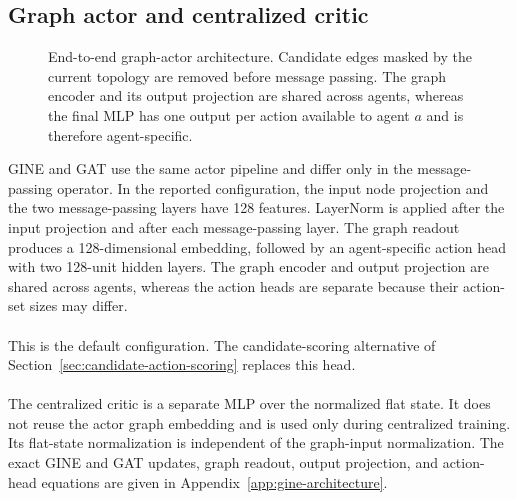 \subsection{Graph actor and centralized critic}
\label{subsec:graph-representation-encoder-boundary}

\begin{figure}[H]
  \color{black}
  \centering
  \resizebox{\textwidth}{!}{%
  }
  \caption{End-to-end graph-actor architecture. Candidate edges masked by the
  current topology are removed before message passing. The graph encoder and
  its output projection are shared across agents, whereas the final MLP has one
  output per action available to agent $a$ and is therefore agent-specific.}
  \label{fig:graph-actor-pipeline}
\end{figure}

GINE and GAT use the same actor pipeline and differ only in the
message-passing operator. In the reported configuration, the input node
projection and the two message-passing layers have 128 features. LayerNorm is
applied after the input projection and after each message-passing layer. The
graph readout produces a 128-dimensional embedding, followed by an
agent-specific action head with two 128-unit hidden layers. The graph encoder
and output projection are shared across agents, whereas the action heads are
separate because their action-set sizes may differ.
\\
\\
This is the default configuration. The
candidate-scoring alternative of Section~\ref{sec:candidate-action-scoring}
replaces this head.
\\
\\
The centralized critic is a separate MLP over the normalized flat state. It
does not reuse the actor graph embedding and is used only during centralized
training. Its flat-state normalization is independent of the graph-input
normalization. The exact GINE and GAT updates, graph readout, output projection,
and action-head equations are given in
Appendix~\ref{app:gine-architecture}.

